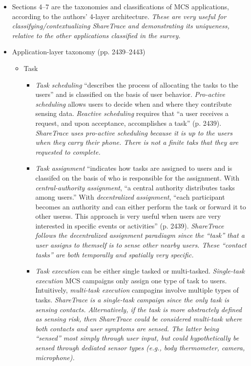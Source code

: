\begin{itemize}
\begin{itemize}
\begin{itemize}
			\end{itemize}
		\end{itemize}
	\item Sections 4--7 are the taxonomies and classifications of MCS applications, according to the authors' 4-layer architecture. \emph{These are very useful for classifying/contextualizing ShareTrace and demonstrating its uniqueness, relative to the other applications classified in the survey.}
	\item Application-layer taxonomy (pp. 2439--2443)
		\begin{itemize}
		\item Task
			\begin{itemize}
			\item \emph{Task scheduling} ``describes the process of allocating the tasks to the users'' and is classified on the basis of user behavior. \emph{Pro-active scheduling} allows users to decide when and where they contribute sensing data. \emph{Reactive scheduling} requires that ``a user receives a request, and upon acceptance, accomplishes a task'' (p. 2439). \emph{ShareTrace uses pro-active scheduling because it is up to the users when they carry their phone. There is not a finite taks that they are requested to complete.}
			\item \emph{Task assignment} ``indicates how tasks are assigned to users and is classifed on the basis of who is responsible for the assignment. With \emph{central-authority assignment}, ``a central authority distributes tasks among users.'' With \emph{decentralized assignment}, ``each participant becomes an authority and can either perform the task or forward it to other userss. This approach is very useful when users are very interested in specific events or activities'' (p. 2439). \emph{ShareTrace follows the decentralized assignment paradiagm since the ``task'' that a user assigns to themself is to sense other nearby users. These ``contact tasks'' are both temporally and spatially very specific.}
			\item \emph{Task execution} can be either single tasked or multi-tasked. \emph{Single-task execution} MCS campaigns only assign one type of task to users. Intuitively, \emph{multi-task execution} campagins involve multiple types of tasks. \emph{ShareTrace is a single-task campaign since the only task is sensing contacts. Alternatively, if the task is more abstractely defined as sensing risk, then ShareTrace could be considered multi-task where both contacts and user symptoms are sensed. The latter being ``sensed'' most simply through user input, but could hypothetically be sensed through dediated sensor types (e.g., body thermometer, camera, microphone).}

\end{itemize}
\end{itemize}
\end{itemize}
